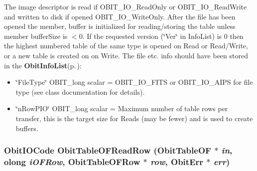 The image descriptor is read if OBIT\_\-IO\_\-Read\-Only or OBIT\_\-IO\_\-Read\-Write and written to disk if opened OBIT\_\-IO\_\-Write\-Only. After the file has been opened the member, buffer is initialized for reading/storing the table unless member buffer\-Size is $<$0. If the requested version (\char`\"{}Ver\char`\"{} in Info\-List) is 0 then the highest numbered table of the same type is opened on Read or Read/Write, or a new table is created on on Write. The file etc. info should have been stored in the {\bf Obit\-Info\-List}{\rm (p.\,\pageref{structObitInfoList})}: \begin{itemize}
\item \char`\"{}File\-Type\char`\"{} OBIT\_\-long scalar = OBIT\_\-IO\_\-FITS or OBIT\_\-IO\_\-AIPS for file type (see class documentation for details). \item \char`\"{}n\-Row\-PIO\char`\"{} OBIT\_\-long scalar = Maximum number of table rows per transfer, this is the target size for Reads (may be fewer) and is used to create buffers. 
\end{itemize}
\subsubsection{\setlength{\rightskip}{0pt plus 5cm}Obit\-IOCode Obit\-Table\-OFRead\-Row ({\bf Obit\-Table\-OF} $\ast$ {\em in}, {\bf olong} {\em i\-OFRow}, {\bf Obit\-Table\-OFRow} $\ast$ {\em row}, {\bf Obit\-Err} $\ast$ {\em err})}\label{ObitTableOF_8h_a18}


